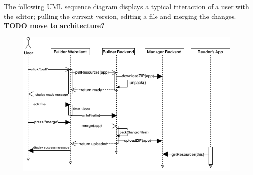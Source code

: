 The following UML sequence diagram displays a typical interaction of a user with the editor; pulling the current version, editing a file and merging the changes.
\textbf{TODO move to architecture?}
\begin{figure}[h]
  \includegraphics[width=\textwidth]{pics/user-flow.uml.drawio.png}
\end{figure}